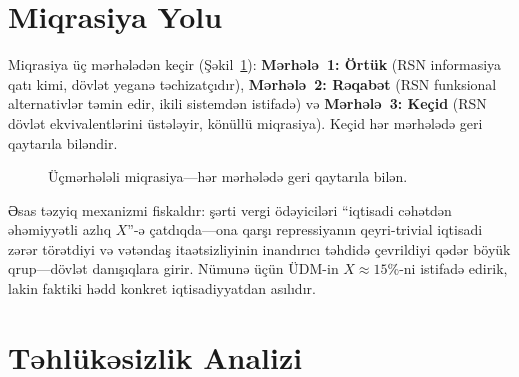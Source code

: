 \documentclass[11pt,a4paper,twocolumn]{article}
\begin{document}
\section{Miqrasiya Yolu}

Miqrasiya üç mərhələdən keçir (Şəkil~\ref{fig:migration}): \textbf{Mərhələ~1: Örtük} (RSN informasiya qatı kimi, dövlət yeganə təchizatçıdır), \textbf{Mərhələ~2: Rəqabət} (RSN funksional alternativlər təmin edir, ikili sistemdən istifadə) və \textbf{Mərhələ~3: Keçid} (RSN dövlət ekvivalentlərini üstələyir, könüllü miqrasiya). Keçid hər mərhələdə geri qaytarıla biləndir.

\begin{figure}[ht]
\centering
{}
\caption{Üçmərhələli miqrasiya---hər mərhələdə geri qaytarıla bilən.}
\label{fig:migration}
\end{figure}

Əsas təzyiq mexanizmi fiskaldır: şərti vergi ödəyiciləri ``iqtisadi cəhətdən əhəmiyyətli azlıq $X$''-ə çatdıqda---ona qarşı repressiyanın qeyri-trivial iqtisadi zərər törətdiyi və vətəndaş itaətsizliyinin inandırıcı təhdidə çevrildiyi qədər böyük qrup---dövlət danışıqlara girir. Nümunə üçün ÜDM-in $X \approx 15\%$-ni istifadə edirik, lakin faktiki hədd konkret iqtisadiyyatdan asılıdır.

\section{Təhlükəsizlik Analizi}
\end{document}
